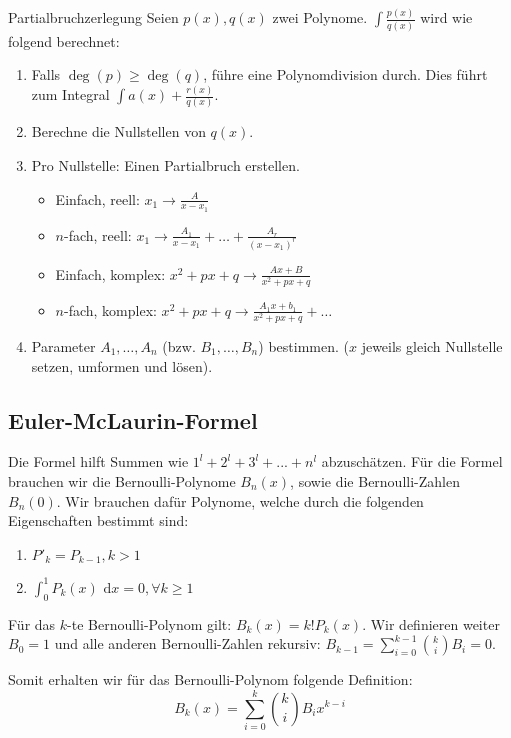 \documentclass[a4paper,10pt]{article}
\def\dx{\text{ d}x}
\begin{document}
\begin{mainbox}{Partialbruchzerlegung}
 Seien $p(x), q(x)$ zwei Polynome. $\int \frac{p(x)}{q(x)}$ wird wie folgend berechnet:
 \begin{enumerate}
  \item Falls $\deg(p) \ge \deg(q)$, führe eine Polynomdivision durch. Dies führt zum Integral $\int a(x) + \frac{r(x)}{q(x)}$.
  \item Berechne die Nullstellen von $q(x)$.
  \item Pro Nullstelle: Einen Partialbruch erstellen.
  \begin{itemize}[left=0pt]
   \item Einfach, reell: $x_1 \to \frac{A}{x - x_1}$
   \item $n$-fach, reell: $x_1 \to \frac{A_1}{x - x_1} + \ldots + \frac{A_r}{(x-x_1)^r}$ 
   \item Einfach, komplex: $x^2 + px + q \to \frac{Ax + B} {x^2 + px + q}$
   \item $n$-fach, komplex: $x^2 + px + q \to \frac{A_1x+b_1}{x^2+px+q} + \ldots$
  \end{itemize}
  \item Parameter $A_1, \ldots, A_n$ (bzw. $B_1, \ldots, B_n$) bestimmen. ($x$ jeweils gleich Nullstelle setzen, umformen und lösen).

 \end{enumerate}
\end{mainbox}

\subsection{Euler-McLaurin-Formel}
Die Formel hilft Summen wie $1^l + 2^l + 3^l + ... + n^l$ abzuschätzen.
Für die Formel brauchen wir die Bernoulli-Polynome $B_n(x)$, sowie die Bernoulli-Zahlen $B_n(0)$.
Wir brauchen dafür Polynome, welche durch die folgenden Eigenschaften bestimmt sind:

\begin{enumerate}
  \item $P'_k = P_{k-1}, k > 1$
  \item $\int_0^1 P_k(x)\dx = 0, \forall k \geq 1$
\end{enumerate}

Für das $k$-te Bernoulli-Polynom gilt: $B_k(x) = k!P_k(x)$. Wir definieren weiter $B_0=1$ und alle anderen Bernoulli-Zahlen rekursiv: $B_{k-1} = \sum_{i=0}^{k-1}{k \choose i}B_i = 0$.

Somit erhalten wir für das Bernoulli-Polynom folgende Definition: $$B_k(x) = \sum_{i=0}^{k}{k \choose i}B_ix^{k-i}$$
\end{document}
